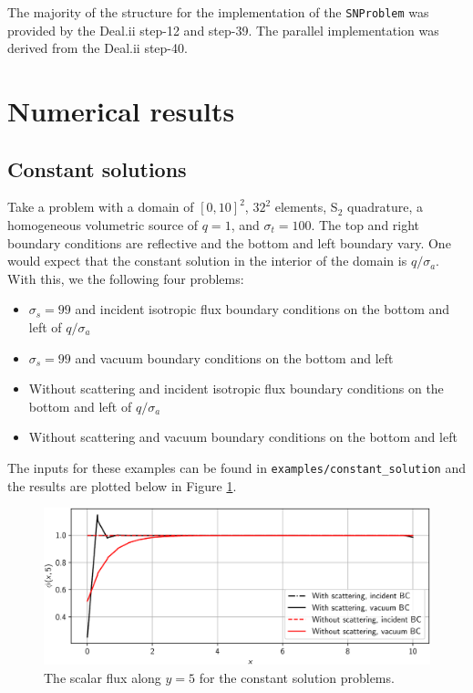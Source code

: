\documentclass{article}
\begin{document}
The majority of the structure for the implementation of the \texttt{SNProblem} was provided by the Deal.ii step-12 and step-39. The parallel implementation was derived from the Deal.ii step-40.

\section{Numerical results}

\subsection{Constant solutions}

Take a problem with a domain of $[0, 10]^2$, $32^2$ elements, S$_2$ quadrature, a homogeneous volumetric source of $q = 1$, and $\sigma_t = 100$. The top and right boundary conditions are reflective and the bottom and left boundary vary. One would expect that the constant solution in the interior of the domain is $q / \sigma_a$. With this, we the following four problems:
\begin{itemize}
	\item $\sigma_s = 99$ and incident isotropic flux boundary conditions on the bottom and left of $q / \sigma_a$
	\item $\sigma_s = 99$ and vacuum boundary conditions on the bottom and left
	\item Without scattering and incident isotropic flux boundary conditions on the bottom and left of $q / \sigma_a$
	\item Without scattering and vacuum boundary conditions on the bottom and left
\end{itemize}

The inputs for these examples can be found in \texttt{examples/constant\_solution} and the results are plotted below in Figure \ref{fig:constant}.

\begin{figure}[H]
	\centering
	\includegraphics[width=0.9\linewidth]{images/constant_solution}
	\caption{The scalar flux along $y = 5$ for the constant solution problems.}
	\label{fig:constant}
\end{figure}
\end{document}
